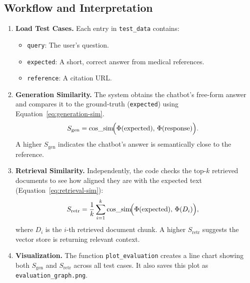 \subsection{Workflow and Interpretation}
\begin{enumerate}
    \item \textbf{Load Test Cases.} Each entry in \texttt{test\_data} contains:
    \begin{itemize}
        \item \texttt{query}: The user’s question.
        \item \texttt{expected}: A short, correct answer from medical references.
        \item \texttt{reference}: A citation URL.
    \end{itemize}
    \item \textbf{Generation Similarity.}  
    The system obtains the chatbot’s free-form answer and compares it to the ground-truth (\texttt{expected}) using Equation~\ref{eq:generation-sim}. 
    \begin{equation}
      S_\mathrm{gen} = \text{cos\_sim}\!\Bigl(\Phi(\text{expected}), \,\Phi(\text{response})\Bigr).
      \label{eq:generation-sim}
    \end{equation}
    A higher $S_\mathrm{gen}$ indicates the chatbot’s answer is semantically close to the reference.

    \item \textbf{Retrieval Similarity.}  
    Independently, the code checks the top-$k$ retrieved documents to see how aligned they are with the expected text (Equation~\ref{eq:retrieval-sim}):
    \begin{equation}
      S_\mathrm{retr} = \frac{1}{k} \sum_{i=1}^k \text{cos\_sim}\!\Bigl(\Phi(\text{expected}), \,\Phi(D_i)\Bigr),
      \label{eq:retrieval-sim}
    \end{equation}
    where $D_i$ is the $i$-th retrieved document chunk. A higher $S_\mathrm{retr}$ suggests the vector store is returning relevant context.

    \item \textbf{Visualization.}  
    The function \texttt{plot\_evaluation} creates a line chart showing both $S_\mathrm{gen}$ and $S_\mathrm{retr}$ across all test cases. It also saves this plot as \texttt{evaluation\_graph.png}.
\end{enumerate}

